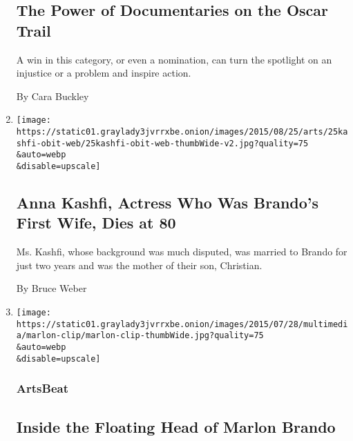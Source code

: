 \begin{enumerate}
  \hypertarget{the-power-of-documentaries-on-the-oscar-trail}{%
  \subsection{The Power of Documentaries on the Oscar
  Trail}\label{the-power-of-documentaries-on-the-oscar-trail}}

  A win in this category, or even a nomination, can turn the spotlight
  on an injustice or a problem and inspire action.

  By Cara Buckley
\item
  \href{/2015/08/26/movies/anna-kashfi-actress-who-was-brandos-first-wife-dies-at-80.html}{}

  \texttt{[image: https://static01.graylady3jvrrxbe.onion/images/2015/08/25/arts/25kashfi-obit-web/25kashfi-obit-web-thumbWide-v2.jpg?quality=75\\\&auto=webp\\\&disable=upscale]}

  \hypertarget{anna-kashfi-actress-who-was-brandos-first-wife-dies-at-80}{%
  \subsection{Anna Kashfi, Actress Who Was Brando's First Wife, Dies at
  80}\label{anna-kashfi-actress-who-was-brandos-first-wife-dies-at-80}}

  Ms. Kashfi, whose background was much disputed, was married to Brando
  for just two years and was the mother of their son, Christian.

  By Bruce Weber
\item
  \href{https://artsbeat.blogs.nytimes3xbfgragh.onion/2015/07/30/inside-the-floating-head-of-marlon-brando/}{}

  \texttt{[image: https://static01.graylady3jvrrxbe.onion/images/2015/07/28/multimedia/marlon-clip/marlon-clip-thumbWide.jpg?quality=75\\\&auto=webp\\\&disable=upscale]}

  \hypertarget{artsbeat}{%
  \subsubsection{ArtsBeat}\label{artsbeat}}

  \hypertarget{inside-the-floating-head-of-marlon-brando}{%
  \subsection{Inside the Floating Head of Marlon
  Brando}\label{inside-the-floating-head-of-marlon-brando}}


\end{enumerate}
